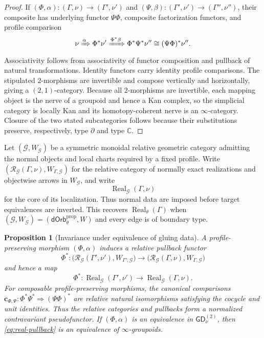 \documentclass[11pt,letterpaper,twoside]{article}
\theoremstyle{plain}
\newtheorem{proposition}[theorem]{Proposition}
\theoremstyle{definition}
\theoremstyle{remark}
\newcommand{\LGrm}{\mathsf{GD}_{\nu}}
\newcommand{\dOrb}{\mathsf{dOrb}}
\newcommand{\Real}{\operatorname{Real}}
\begin{document}
\begin{proof}
If \((\Phi,\alpha):(\Gamma,\nu)\to(\Gamma',\nu')\) and
\((\Psi,\beta):(\Gamma',\nu')\to(\Gamma'',\nu'')\), their composite has underlying functor \(\Psi\Phi\), composite factorization functors, and profile comparison
\[
 \nu\xRightarrow{\alpha}\Phi^*\nu'
 \xRightarrow{\Phi^*\beta}
 \Phi^*\Psi^*\nu''\cong(\Psi\Phi)^*\nu''.
\]
Associativity follows from associativity of functor composition and pullback of natural transformations.  Identity functors carry identity profile comparisons.  The stipulated \(2\)-morphisms are invertible and compose vertically and horizontally, giving a \((2,1)\)-category.  Because all \(2\)-morphisms are invertible, each mapping object is the nerve of a groupoid and hence a Kan complex, so the simplicial category is locally Kan and its homotopy-coherent nerve is an \(\infty\)-category.  Closure of the two stated subcategories follows because their substitutions preserve, respectively, type \(\partial\) and type \(\mathbb C\).
\end{proof}

Let \((\mathcal G,W_{\mathcal G})\) be a symmetric monoidal relative geometric category admitting the normal objects and local charts required by a fixed profile.  Write \((\mathcal R_{\mathcal G}(\Gamma,\nu),W_{\Gamma,\mathcal G})\) for the relative category of normally exact realizations and objectwise arrows in \(W_{\mathcal G}\), and write
\[
 \Real_{\mathcal G}(\Gamma,\nu)
\]
for the core of its localization.  Thus normal data are imposed before target equivalences are inverted.  This recovers \(\Real_\theta(\Gamma)\) when \((\mathcal G,W_{\mathcal G})=(\dOrb_\theta^{\mathrm{prop}},W)\) and every edge is of boundary type.

\begin{proposition}[Invariance under equivalence of gluing data]\label{prop:grammar-invariance}
A profile-preserving morphism \((\Phi,\alpha)\) induces a relative pullback functor
\[
 \Phi^*:\bigl(\mathcal R_{\mathcal G}(\Gamma',\nu'),W_{\Gamma',\mathcal G}\bigr)
 \longrightarrow
 \bigl(\mathcal R_{\mathcal G}(\Gamma,\nu),W_{\Gamma,\mathcal G}\bigr)
\]
and hence a map
\begin{equation}\label{eq:real-pullback}
 \Phi^*:\Real_{\mathcal G}(\Gamma',\nu')
 \longrightarrow\Real_{\mathcal G}(\Gamma,\nu).
\end{equation}
For composable profile-preserving morphisms, the canonical comparisons \(\mathbf c_{\Phi,\Psi}:\Phi^*\Psi^*\Rightarrow(\Psi\Phi)^*\) are relative natural isomorphisms satisfying the cocycle and unit identities.  Thus the relative categories and pullbacks form a normalized contravariant pseudofunctor.  If \((\Phi,\alpha)\) is an equivalence in \(\LGrm^{(2)}\), then \eqref{eq:real-pullback} is an equivalence of \(\infty\)-groupoids.
\end{proposition}
\end{document}
